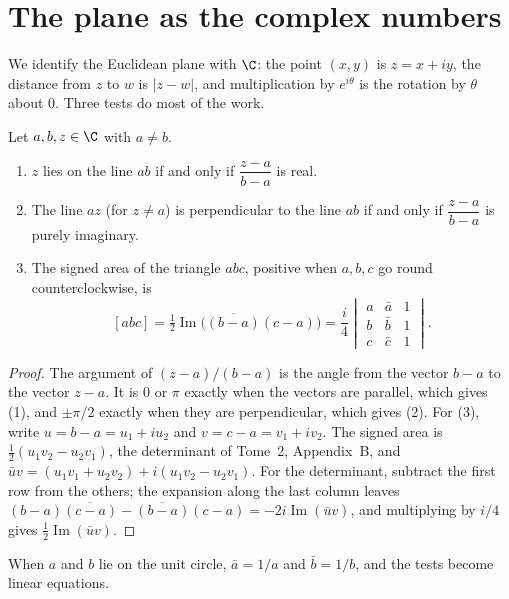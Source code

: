 \section{The plane as the complex numbers}

We identify the Euclidean plane with $\C$: the point $(x,y)$ is $z=x+iy$, the distance from $z$ to $w$ is $|z-w|$, and
multiplication by $e^{i\theta}$ is the rotation by $\theta$ about $0$. Three tests do most of the work.

\begin{proposition}\label{geometry:prop:tests}
Let $a,b,z\in\C$ with $a\ne b$.
\begin{enumerate}
\item $z$ lies on the line $ab$ if and only if $\dfrac{z-a}{b-a}$ is real.
\item The line $az$ (for $z\ne a$) is perpendicular to the line $ab$ if and only if $\dfrac{z-a}{b-a}$ is purely imaginary.
\item The signed area of the triangle $abc$, positive when $a,b,c$ go round counterclockwise, is
\[
[abc]=\tfrac12\operatorname{Im}\bigl(\overline{(b-a)}(c-a)\bigr)=\frac i4\begin{vmatrix}a&\bar a&1\\ b&\bar b&1\\ c&\bar c&1\end{vmatrix}.
\]
\end{enumerate}
\end{proposition}
\begin{proof}
The argument of $(z-a)/(b-a)$ is the angle from the vector $b-a$ to the vector $z-a$. It is $0$ or $\pi$ exactly when the
vectors are parallel, which gives (1), and $\pm\pi/2$ exactly when they are perpendicular, which gives (2). For (3), write
$u=b-a=u_1+iu_2$ and $v=c-a=v_1+iv_2$. The signed area is $\frac12(u_1v_2-u_2v_1)$, the determinant of Tome~2, Appendix~B, and
$\bar uv=(u_1v_1+u_2v_2)+i(u_1v_2-u_2v_1)$. For the determinant, subtract the first row from the others; the expansion
along the last column leaves $(b-a)\overline{(c-a)}-\overline{(b-a)}(c-a)=-2i\operatorname{Im}(\bar uv)$, and multiplying by
$i/4$ gives $\frac12\operatorname{Im}(\bar uv)$.
\end{proof}

When $a$ and $b$ lie on the unit circle, $\bar a=1/a$ and $\bar b=1/b$, and the tests become linear equations.

